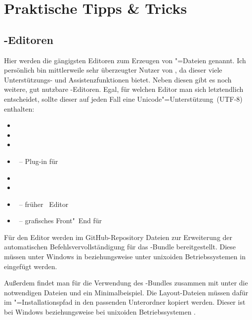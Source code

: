 \chapter{Praktische Tipps \& Tricks}
\label{sec:tips}
\section{-Editoren}
\label{sec:tips:editor}
Hier werden die gängigsten Editoren zum Erzeugen von "=Dateien 
genannt. Ich persönlich bin mittlerweile sehr überzeugter Nutzer von 
, da dieser viele Unterstützungs- und 
Assistenzfunktionen bietet. Neben diesen gibt es noch weitere, gut nutzbare 
-Editoren. Egal, für welchen Editor man sich letztendlich 
entscheidet, sollte dieser auf jeden Fall eine Unicode"=Unterstützung~(UTF-8) 
enthalten:
%
\begin{itemize}
\item {}
\item {}
\item {}
\item {}~-- Plug-in für 
\item {}
\item {}
\item {}~-- früher ~Editor
\item {}~-- grafisches Front"~End für 
\end{itemize}
%
Für den Editor werden im GitHub-Repository
Dateien zur Erweiterung der automatischen Befehlsvervollständigung für das 
\TUDScript-Bundle bereitgestellt. Diese müssen unter Windows in
 beziehungsweise unter unixoiden 
Betriebssystemen in  eingefügt werden.

Außerdem findet man für die Verwendung des \TUDScript-Bundles zusammen mit 
 unter
die notwendigen Dateien und ein Minimalbeispiel. Die Layout-Dateien müssen 
dafür im "=Installationspfad in den passenden 
Unterordner kopiert werden. Dieser ist bei Windows
beziehungsweise bei unixoiden Betriebssystemen .



